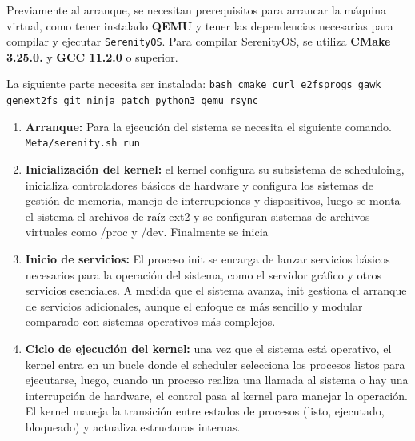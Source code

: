 Previamente al arranque, se necesitan prerequisitos para arrancar la máquina virtual, como tener instalado \textbf{QEMU} y tener las dependencias necesarias para compilar y ejecutar \texttt{SerenityOS}. Para compilar SerenityOS, se utiliza \textbf{CMake 3.25.0.} y \textbf{GCC 11.2.0} o superior. 

La siguiente parte necesita ser instalada: \verb|bash cmake curl e2fsprogs gawk genext2fs git ninja patch python3 qemu rsync| 
\begin{enumerate}
    \item \textbf{Arranque:} Para la ejecución del sistema se necesita el siguiente comando. \verb|Meta/serenity.sh run|
    \item \textbf{Inicialización del kernel:} el kernel configura su subsistema de scheduloing, inicializa controladores básicos de hardware y configura los sistemas de gestión de memoria, manejo de interrupciones y dispositivos, luego se monta el sistema el archivos de raíz ext2 y se configuran sistemas de archivos virtuales como /proc y /dev. Finalmente se inicia 
    \item \textbf{Inicio de  servicios:} El proceso init se encarga de lanzar servicios básicos necesarios para la operación del sistema, como el servidor gráfico y otros servicios esenciales. A medida que el sistema avanza, init gestiona el arranque de servicios adicionales, aunque el enfoque es más sencillo y modular comparado con sistemas operativos más complejos.
    
    \item \textbf{Ciclo de ejecución del kernel:} una vez que el sistema está operativo, el kernel entra en un bucle donde el scheduler selecciona los procesos listos para ejecutarse, luego, cuando un proceso realiza una llamada al sistema o hay una interrupción de hardware, el control pasa al kernel para manejar la operación. El kernel maneja la transición entre estados de procesos (listo, ejecutado, bloqueado) y actualiza estructuras internas.
\end{enumerate}
